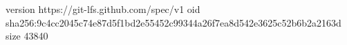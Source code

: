 version https://git-lfs.github.com/spec/v1
oid sha256:9c4cc2045c74e87d5f1bd2e55452c99344a26f7ea8d542e3625c52b6b2a2163d
size 43840
